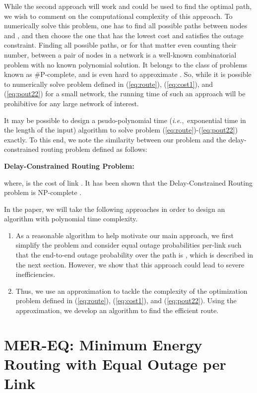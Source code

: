 \documentclass[10pt,journal]{IEEEtran}
\theoremstyle{definition}
\newcommand{\ie}{\textit{i.e.},}
\begin{document}
{While the second approach will work and could be used to find the optimal path, we wish to comment on the computational complexity of this approach. To numerically solve this problem, one has to find all possible paths between nodes  and , and then choose the one that has the lowest cost and satisfies the outage constraint. 
Finding all possible paths, or for that matter even counting their number, between a pair of nodes in a network is a well-known combinatorial problem with no known polynomial solution. It belongs to the class of problems known as \mbox{\#P-complete}, and is even hard to approximate \cite{valiant1979complexity}. 
So, while it is possible to numerically solve problem defined in (\ref{eq:route}), (\ref{eq:cost1}), and (\ref{eq:pout22}) for a small network, the running time of such an approach will be prohibitive for any large network of interest.}

{It may be  possible to design a psudo-polynomial time (\ie\ exponential time in the length of the input) algorithm to solve problem (\ref{eq:route})-(\ref{eq:pout22}) exactly. To this end, we note the similarity between our problem and the delay-constrained routing problem defined as follows:}

\textbf{{Delay-Constrained Routing Problem:} }

{}
{where,  is the cost of link . It has been shown that the Delay-Constrained Routing problem is NP-complete \cite{wang1996quality}. }
	


{In the paper, we will take the following approaches in order to design an algorithm with polynomial time complexity.}
\begin{enumerate}
	\item 
	As a reasonable algorithm to help motivate our main approach, we first simplify the problem and consider equal outage probabilities per-link    such that the end-to-end outage probability over the path is ,  which is described in the next section. However, we show that  this approach could lead to severe inefficiencies.  
\item
Thus, we use an approximation to tackle the complexity of the optimization problem defined in (\ref{eq:route}), (\ref{eq:cost1}), and (\ref{eq:pout22}). Using the approximation, we develop an algorithm to find the efficient route. 
\end{enumerate}


\section{MER-EQ: Minimum Energy Routing with Equal Outage per Link}\label{sec:equal}
\end{document}
